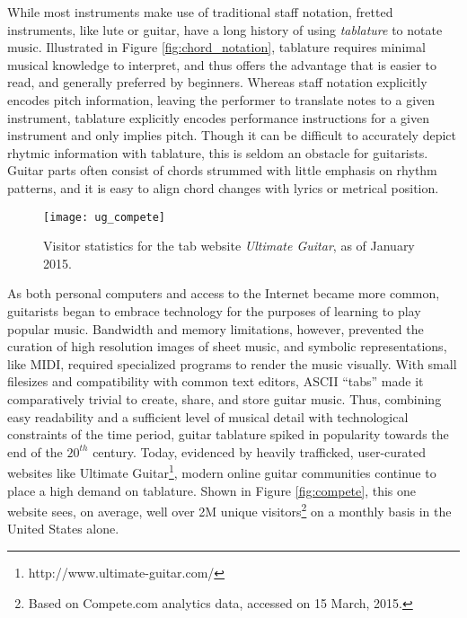 While most instruments make use of traditional staff notation, fretted instruments, like lute or guitar, have a long history of using \emph{tablature} to notate music.
Illustrated in Figure \ref{fig:chord_notation}, tablature requires minimal musical knowledge to interpret, and thus offers the advantage that is easier to read, and generally preferred by beginners.
Whereas staff notation explicitly encodes pitch information, leaving the performer to translate notes to a given instrument, tablature explicitly encodes performance instructions for a given instrument and only implies pitch.
Though it can be difficult to accurately depict rhytmic information with tablature, this is seldom an obstacle for guitarists.
Guitar parts often consist of chords strummed with little emphasis on rhythm patterns, and it is easy to align chord changes with lyrics or metrical position.

\begin{figure}[t!]
  \centering
  \centerline{\texttt{[image: ug\_compete]}}
\caption{Visitor statistics for the tab website \emph{Ultimate Guitar}, as of January 2015.}
\label{fig:ug_compete}
%
\end{figure}

As both personal computers and access to the Internet became more common, guitarists began to embrace technology for the purposes of learning to play popular music.
Bandwidth and memory limitations, however, prevented the curation of high resolution images of sheet music, and symbolic representations, like MIDI, required specialized programs to render the music visually.
With small filesizes and compatibility with common text editors, ASCII ``tabs'' made it comparatively trivial to create, share, and store guitar music.
Thus, combining easy readability and a sufficient level of musical detail with technological constraints of the time period, guitar tablature spiked in popularity towards the end of the $20^{th}$ century.
Today, evidenced by heavily trafficked, user-curated websites like Ultimate Guitar\footnote{http://www.ultimate-guitar.com/}, modern online guitar communities continue to place a high demand on tablature.
Shown in Figure \ref{fig:compete}, this one website sees, on average, well over 2M unique visitors\footnote{Based on Compete.com analytics data, accessed on 15 March, 2015.} on a monthly basis in the United States alone.

